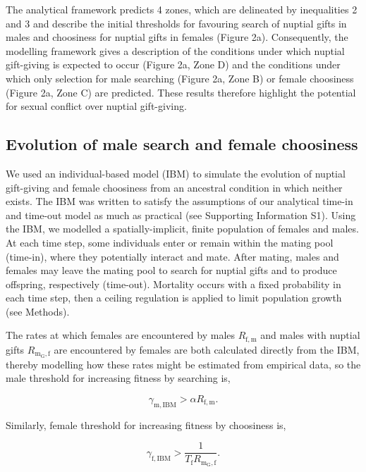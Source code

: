 \documentclass[
]{article}
\begin{document}
The analytical framework predicts 4 zones, which are delineated by
inequalities 2 and 3 and describe the initial thresholds for favouring
search of nuptial gifts in males and choosiness for nuptial gifts in
females (Figure 2a). Consequently, the modelling framework gives a
description of the conditions under which nuptial gift-giving is
expected to occur (Figure 2a, Zone D) and the conditions under which
only selection for male searching (Figure 2a, Zone B) or female
choosiness (Figure 2a, Zone C) are predicted. These results therefore
highlight the potential for sexual conflict over nuptial gift-giving.

\hypertarget{evolution-of-male-search-and-female-choosiness}{%
\subsection{Evolution of male search and female
choosiness}\label{evolution-of-male-search-and-female-choosiness}}

We used an individual-based model (IBM) to simulate the evolution of
nuptial gift-giving and female choosiness from an ancestral condition in
which neither exists. The IBM was written to satisfy the assumptions of
our analytical time-in and time-out model as much as practical (see
Supporting Information S1). Using the IBM, we modelled a
spatially-implicit, finite population of females and males. At each time
step, some individuals enter or remain within the mating pool (time-in),
where they potentially interact and mate. After mating, males and
females may leave the mating pool to search for nuptial gifts and to
produce offspring, respectively (time-out). Mortality occurs with a
fixed probability in each time step, then a ceiling regulation is
applied to limit population growth (see Methods).

The rates at which females are encountered by males
\(R_{\mathrm{f},\mathrm{m}}\) and males with nuptial gifts
\(R_{\mathrm{m_{G}}, \mathrm{f}}\) are encountered by females are both
calculated directly from the IBM, thereby modelling how these rates
might be estimated from empirical data, so the male threshold for
increasing fitness by searching is,

\begin{equation}
\gamma_{\mathrm{m, IBM}} > \alpha R_{\mathrm{f},\mathrm{m}}.
\end{equation}

Similarly, female threshold for increasing fitness by choosiness is,

\begin{equation}
\gamma_{\mathrm{f, IBM}} > \frac{1}{T_{\mathrm{f}}R_{\mathrm{m_{G}}, \mathrm{f}}}.
\end{equation}
\end{document}
